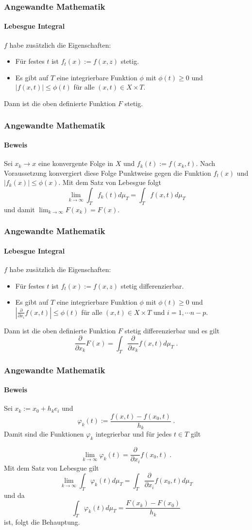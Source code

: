 \documentclass{beamer}
\begin{document}
\begin{frame}
    \frametitle{Angewandte Mathematik}
\framesubtitle{Lebesgue Integral}
\begin{block}{}
$f$ habe zusätzlich die Eigenschaften:
\begin{itemize}
\item Für festes $t$ ist $f_t(x):= f(x,z)$ stetig.
\item Es gibt auf $T$ eine integrierbare Funktion $\phi$ mit $\phi(t) \geq 0$ und $|f(x,t)| \leq \phi(t)$ für alle $(x,t) \in X \times T$.
\end{itemize}
Dann ist die oben definierte Funktion $F$ stetig. 
\end{block}
 \end{frame}


\begin{frame}
    \frametitle{Angewandte Mathematik}
\framesubtitle{Beweis}
Sei  $x_k \to x$   eine konvergente Folge in $X$ und $f_k(t):= f(x_k,t)$. Nach Voraussetzung konvergiert diese Folge Punktweise gegen die Funktion $f_t(x)$ und $| f_k (x) | \leq \phi(x)$. Mit dem Satz von Lebesgue folgt
$$ \lim_{k \to \infty} \int_T f_k(t) d \mu_T = \int_T f(x,t) d \mu_T$$
und damit $ \lim_{k \to \infty} F(x_k) =  F(x)$.
 \end{frame}

\begin{frame}
    \frametitle{Angewandte Mathematik}
\framesubtitle{Lebesgue Integral}
\begin{block}{}
$f$ habe zusätzlich die Eigenschaften:
\begin{itemize}
\item Für festes $t$ ist $f_t(x):= f(x,z)$ stetig differenzierbar.
\item Es gibt auf $T$ eine integrierbare Funktion $\phi$ mit $\phi(t) \geq 0$ und $| \frac{\partial}{\partial x_i} f(x,t)| \leq \phi(t)$ für alle $(x,t) \in X \times T$ und $i=1, \cdots n-p$.
\end{itemize}
Dann ist die oben definierte Funktion $F$ stetig differenzierbar und es gilt
$$\frac{\partial}{\partial x_k} F(x)  = \int_T \frac{\partial}{\partial x_k} f(x,t) d \mu_T \; .$$ 
\end{block}
 \end{frame}

\begin{frame}
    \frametitle{Angewandte Mathematik}
\framesubtitle{Beweis}
Sei $x_k := x_0 + h_k e_i$ und 
$$ \varphi_k (t) := \frac{f(x,t)  - f(x_0,t)  }{h_k} \; .$$
Damit sind die Funktionen  $\varphi_k $ integrierbar und für jedes $t \in T$ gilt

$$  \lim_{k \to \infty} \varphi_k (t) = \frac{\partial}{\partial x_i}f(x_0, t) \; .$$
Mit dem Satz von Lebesgue gilt
$$ \lim_{k \to \infty}  \int_T \varphi_k (t) d \mu_T = \int_T   \frac{\partial}{\partial x_i}f(x_0, t) d \mu_T $$
und da 
$$  \int_T \varphi_k (t) d \mu_T = \frac{F(x_k) -F(x_0)}{h_k}$$ ist, folgt die Behauptung.
 \end{frame}
\end{document}
